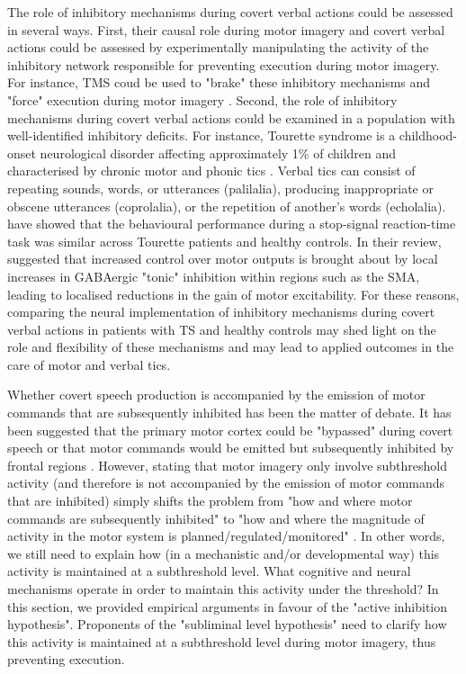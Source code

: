 \documentclass[utf8]{template/frontiersSCNS} %
\begin{document}
The role of inhibitory mechanisms during covert verbal actions could be assessed in several ways. First, their causal role during motor imagery and covert verbal actions could be assessed by experimentally manipulating the activity of the inhibitory network responsible for preventing execution during motor imagery. For instance, TMS coud be used to "brake" these inhibitory mechanisms and "force" execution during motor imagery \citep[e.g.,][]{angelini_motor_2015, angelini_proactive_2016}. Second, the role of inhibitory mechanisms during covert verbal actions could be examined in a population with well-identified inhibitory deficits. For instance, Tourette syndrome is a childhood-onset neurological disorder affecting approximately 1\% of children and characterised by chronic motor and phonic tics \citep{jackson_inhibition_2015}. Verbal tics can consist of repeating sounds, words, or utterances (palilalia), producing inappropriate or obscene utterances (coprolalia), or the repetition of another’s words (echolalia). \cite{ganos_action_2014} have showed that the behavioural performance during a stop-signal reaction-time task was similar across Tourette patients and healthy controls. In their review, \cite{jackson_inhibition_2015} suggested that increased control over motor outputs is brought about by local increases in GABAergic "tonic" inhibition within regions such as the SMA, leading to localised reductions in the gain of motor excitability. For these reasons, comparing the neural implementation of inhibitory mechanisms during covert verbal actions in patients with TS and healthy controls may shed light on the role and flexibility of these mechanisms and may lead to applied outcomes in the care of motor and verbal tics.

Whether covert speech production is accompanied by the emission of motor commands that are subsequently inhibited has been the matter of debate. It has been suggested that the primary motor cortex could be "bypassed" during covert speech  \citep[e.g.,][]{tian_mental_2012, tian_effect_2013, tian_mental_2016} or that motor commands would be emitted but subsequently inhibited by frontal regions \citep[e.g.,][]{loevenbruck_cognitive_2018}. However, stating that motor imagery only involve subthreshold activity (and therefore is not accompanied by the emission of motor commands that are inhibited) simply shifts the problem from "how and where motor commands are subsequently inhibited" to "how and where the magnitude of activity in the motor system is planned/regulated/monitored" \citep[see also][]{scheil_motor_2018}. In other words, we still need to explain how (in a mechanistic and/or developmental way) this activity is maintained at a subthreshold level. What cognitive and neural mechanisms operate in order to maintain this activity under the threshold? In this section, we provided empirical arguments in favour of the "active inhibition hypothesis". Proponents of the "subliminal level hypothesis" need to clarify how this activity is maintained at a subthreshold level during motor imagery, thus preventing execution.
\end{document}
